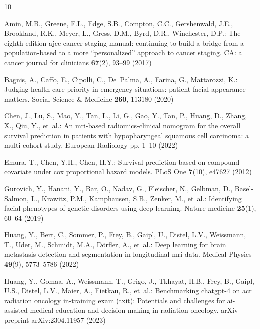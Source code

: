 \documentclass[runningheads]{llncs}
\newcommand{\TODO}[1]{\textcolor{red}{#1}}
\begin{document}
%
%
\begin{thebibliography}{10}
\providecommand{\url}[1]{\texttt{#1}}
\providecommand{\urlprefix}{URL }
\providecommand{\doi}[1]{https://doi.org/#1}

Amin, M.B., Greene, F.L., Edge, S.B., Compton, C.C., Gershenwald, J.E.,
  Brookland, R.K., Meyer, L., Gress, D.M., Byrd, D.R., Winchester, D.P.: The
  eighth edition ajcc cancer staging manual: continuing to build a bridge from
  a population-based to a more “personalized” approach to cancer staging.
  CA: a cancer journal for clinicians  \textbf{67}(2),  93--99 (2017)

Bagnis, A., Caffo, E., Cipolli, C., De~Palma, A., Farina, G., Mattarozzi, K.:
  Judging health care priority in emergency situations: patient facial
  appearance matters. Social Science \& Medicine  \textbf{260},  113180 (2020)

Chen, J., Lu, S., Mao, Y., Tan, L., Li, G., Gao, Y., Tan, P., Huang, D., Zhang,
  X., Qiu, Y., et~al.: An mri-based radiomics-clinical nomogram for the overall
  survival prediction in patients with hypopharyngeal squamous cell carcinoma:
  a multi-cohort study. European Radiology pp. 1--10 (2022)

Emura, T., Chen, Y.H., Chen, H.Y.: Survival prediction based on compound
  covariate under cox proportional hazard models. PLoS One  \textbf{7}(10),
  e47627 (2012)

Gurovich, Y., Hanani, Y., Bar, O., Nadav, G., Fleischer, N., Gelbman, D.,
  Basel-Salmon, L., Krawitz, P.M., Kamphausen, S.B., Zenker, M., et~al.:
  Identifying facial phenotypes of genetic disorders using deep learning.
  Nature medicine  \textbf{25}(1),  60--64 (2019)

Huang, Y., Bert, C., Sommer, P., Frey, B., Gaipl, U., Distel, L.V., Weissmann,
  T., Uder, M., Schmidt, M.A., D{\"o}rfler, A., et~al.: Deep learning for brain
  metastasis detection and segmentation in longitudinal mri data. Medical
  Physics  \textbf{49}(9),  5773--5786 (2022)

Huang, Y., Gomaa, A., Weissmann, T., Grigo, J., Tkhayat, H.B., Frey, B., Gaipl,
  U.S., Distel, L.V., Maier, A., Fietkau, R., et~al.: Benchmarking chatgpt-4 on
  acr radiation oncology in-training exam (txit): Potentials and challenges for
  ai-assisted medical education and decision making in radiation oncology.
  arXiv preprint arXiv:2304.11957  (2023)


\end{thebibliography}
\end{document}
